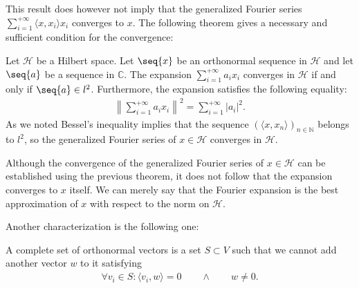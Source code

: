     This result does however not imply that the generalized Fourier series $\sum_{i=1}^{+\infty}\langle x, x_i\rangle x_i$ converges to $x$. The following theorem gives a necessary and sufficient condition for the convergence:
    \begin{theorem}
        Let $\mathcal{H}$ be a Hilbert space. Let $\seq{x}$ be an orthonormal sequence in $\mathcal{H}$ and let $\seq{a}$ be a sequence in $\mathbb{C}$. The expansion $\sum_{i=1}^{+\infty}a_ix_i$ converges in $\mathcal{H}$ if and only if $\seq{a}\in l^2$. Furthermore, the expansion satisfies the following equality:
        \begin{gather}
            \left\lVert\sum_{i=1}^{+\infty}a_ix_i\right\rVert^2 = \sum_{i=1}^{+\infty}|a_i|^2.
        \end{gather}
        As we noted Bessel's inequality implies that the sequence $(\langle x, x_n\rangle)_{n\in\mathbb{N}}$ belongs to $l^2$, so the generalized Fourier series of $x\in\mathcal{H}$ converges in $\mathcal{H}$.
    \end{theorem}
    \begin{remark}
        Although the convergence of the generalized Fourier series of $x\in\mathcal{H}$ can be established using the previous theorem, it does not follow that the expansion converges to $x$ itself. We can merely say that the Fourier expansion is the best approximation of $x$ with respect to the norm on $\mathcal{H}$.
    \end{remark}

    Another characterization is the following one:
    \begin{adefinition}
        A complete set of orthonormal vectors is a set $S\subset V$ such that we cannot add another vector $w$ to it satisfying
        \begin{gather}
            \forall v_i\in S: \langle v_i, w\rangle = 0\qquad\land\qquad  w\neq0.
        \end{gather}
    \end{adefinition}

